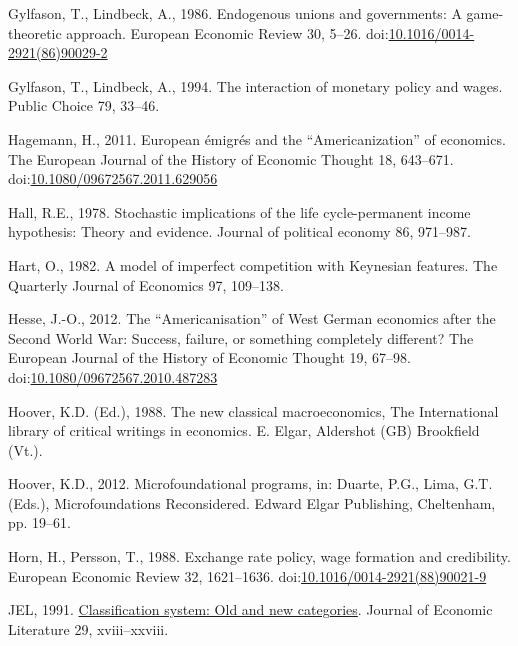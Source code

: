 \documentclass[
  12pt,
  onecolumn]{article}
\newlength{\cslhangindent}
\newlength{\cslentryspacingunit} %
\newenvironment{CSLReferences}[2] %
 {%
  \setlength{\parindent}{0pt}
  \ifodd #1
  \let\oldpar\par
  \def\par{\hangindent=\cslhangindent\oldpar}
  \fi
  \setlength{\parskip}{#2\cslentryspacingunit}
 }%
 {}
\begin{document}
\begin{CSLReferences}{1}{0}
\leavevmode{}%
Gylfason, T., Lindbeck, A., 1986. Endogenous unions and governments: {A} game-theoretic approach. European Economic Review 30, 5--26. doi:\href{https://doi.org/10.1016/0014-2921(86)90029-2}{10.1016/0014-2921(86)90029-2}

\leavevmode{}%
Gylfason, T., Lindbeck, A., 1994. The interaction of monetary policy and wages. Public Choice 79, 33--46.

\leavevmode{}%
Hagemann, H., 2011. European émigrés and the {``{Americanization}''} of economics. The European Journal of the History of Economic Thought 18, 643--671. doi:\href{https://doi.org/10.1080/09672567.2011.629056}{10.1080/09672567.2011.629056}

\leavevmode{}%
Hall, R.E., 1978. Stochastic implications of the life cycle-permanent income hypothesis: Theory and evidence. Journal of political economy 86, 971--987.

\leavevmode{}%
Hart, O., 1982. A model of imperfect competition with {Keynesian} features. The Quarterly Journal of Economics 97, 109--138.

\leavevmode{}%
Hesse, J.-O., 2012. The {``{Americanisation}''} of {West German} economics after the {Second World War}: {Success}, failure, or something completely different? The European Journal of the History of Economic Thought 19, 67--98. doi:\href{https://doi.org/10.1080/09672567.2010.487283}{10.1080/09672567.2010.487283}

\leavevmode{}%
Hoover, K.D. (Ed.), 1988. The new classical macroeconomics, The {International} library of critical writings in economics. E. Elgar, Aldershot (GB) Brookfield (Vt.).

\leavevmode{}%
Hoover, K.D., 2012. Microfoundational programs, in: Duarte, P.G., Lima, G.T. (Eds.), Microfoundations {Reconsidered}. Edward Elgar Publishing, Cheltenham, pp. 19--61.

\leavevmode{}%
Horn, H., Persson, T., 1988. Exchange rate policy, wage formation and credibility. European Economic Review 32, 1621--1636. doi:\href{https://doi.org/10.1016/0014-2921(88)90021-9}{10.1016/0014-2921(88)90021-9}

\leavevmode{}%
JEL, 1991. \href{https://www.jstor.org/stable/2727351}{Classification system: Old and new categories}. Journal of Economic Literature 29, xviii--xxviii.


\end{CSLReferences}
\end{document}
